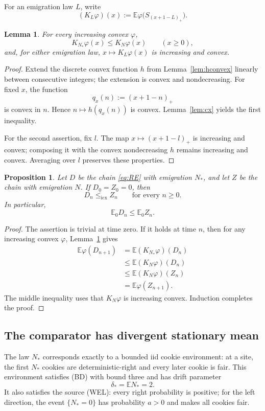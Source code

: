 \documentclass[11pt]{article}
\newtheorem{lemma}[theorem]{Lemma}
\newtheorem{proposition}[theorem]{Proposition}
\newcommand{\E}{\mathbb E}
\newcommand{\icx}{\le_{\mathrm{icx}}}
\begin{document}
For an emigration law $L$, write
\[
 (K_L\varphi)(x):=\E\varphi\bigl(S_{(x+1-L)_+}\bigr).
\]

\begin{lemma}\label{lem:kernel}
For every increasing convex $\varphi$,
\[
 K_{N_*}\varphi(x)\le K_N\varphi(x)\qquad(x\ge0),
\]
and, for either emigration law, $x\mapsto K_L\varphi(x)$ is increasing and convex.
\end{lemma}

\begin{proof}
Extend the discrete convex function $h$ from Lemma~\ref{lem:hconvex} linearly between consecutive integers; the extension is convex and nondecreasing.  For fixed $x$, the function
\[
 q_x(n):=(x+1-n)_+
\]
is convex in $n$.  Hence $n\mapsto h(q_x(n))$ is convex.  Lemma~\ref{lem:cx} yields the first inequality.

For the second assertion, fix $l$.  The map $x\mapsto(x+1-l)_+$ is increasing and convex; composing it with the convex nondecreasing $h$ remains increasing and convex.  Averaging over $l$ preserves these properties.
\end{proof}

\begin{proposition}\label{prop:icx}
Let $D$ be the chain \eqref{eq:RE} with emigration $N_*$, and let $Z$ be the chain with emigration $N$.  If $D_0=Z_0=0$, then
\[
 D_n\icx Z_n\qquad\text{for every }n\ge0.
\]
In particular,
\[
 \E_0D_n\le\E_0Z_n.
\]
\end{proposition}

\begin{proof}
The assertion is trivial at time zero.  If it holds at time $n$, then for any increasing convex $\varphi$, Lemma~\ref{lem:kernel} gives
\[
\begin{aligned}
 \E\varphi(D_{n+1})
 &=\E(K_{N_*}\varphi)(D_n)\\
 &\le\E(K_N\varphi)(D_n)\\
 &\le\E(K_N\varphi)(Z_n)\\
 &=\E\varphi(Z_{n+1}).
\end{aligned}
\]
The middle inequality uses that $K_N\varphi$ is increasing convex.  Induction completes the proof.
\end{proof}

\subsection{The comparator has divergent stationary mean}

The law $N_*$ corresponds exactly to a bounded iid cookie environment: at a site, the first $N_*$ cookies are deterministic-right and every later cookie is fair.  This environment satisfies (BD) with bound three and has drift parameter
\[
 \delta_*=\E N_*=2.
\]
It also satisfies the source (WEL): every right probability is positive; for the left direction, the event $\{N_*=0\}$ has probability $a>0$ and makes all cookies fair.
\end{document}

